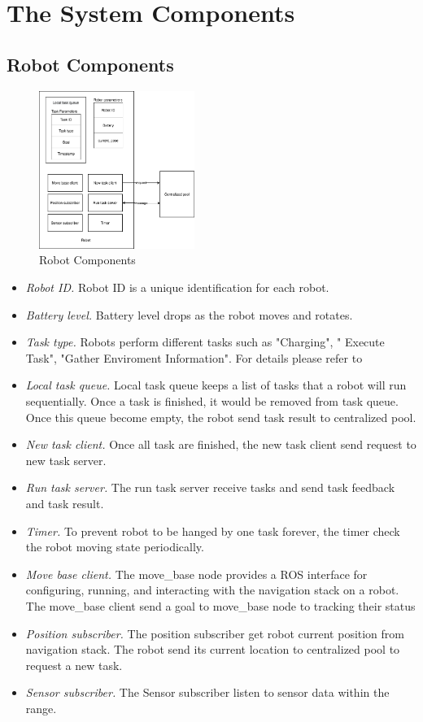 \section{The System Components}


\subsection{Robot Components}


\begin{figure}[htb]
	\centering
	\includegraphics[width = 0.45\textwidth]{content/images/ch3/system_component_robot.drawio.png}
	\caption{Robot Components}
	\label{fig:robot_components}
\end{figure}

\begin{itemize}
	\item \textsl{Robot ID.} Robot ID is a unique identification for each robot.
	\item \textsl{Battery level.} Battery level drops as the robot moves and rotates.
	\item \textsl{Task type.} Robots perform different tasks such as "Charging", " Execute Task", "Gather Enviroment Information". For details please refer to 
	\item \textsl{Local task queue.} Local task queue keeps a list of tasks that a robot will run sequentially. Once a task is finished, it would be removed from task queue. Once this queue become empty, the robot send task result to centralized pool.
	\item \textsl{New task client.} Once all task are finished, the new task client send request to new task server.
	\item \textsl{Run task server.} The run task server receive tasks and send task feedback and task result.
	\item \textsl{Timer.} To prevent robot to be hanged by one task forever, the timer check the robot moving state periodically.
	\item \textsl{Move base client.} The move\_base node provides a ROS interface for configuring, running, and interacting with the navigation stack on a robot. The move\_base client send a goal to move\_base node to tracking their status  
	\item \textsl{Position subscriber.} The position subscriber get robot current position from navigation stack. The robot send its current location to centralized pool to request a new task.
	\item \textsl{Sensor subscriber.} The Sensor subscriber listen to sensor data within the range.
\end{itemize}

